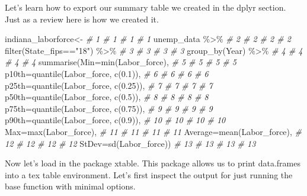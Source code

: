 \documentclass[
]{book}
\newenvironment{Shaded}{\begin{snugshade}}{\end{snugshade}}
\newcommand{\AttributeTok}[1]{\textcolor[rgb]{0.77,0.63,0.00}{#1}}
\newcommand{\CommentTok}[1]{\textcolor[rgb]{0.56,0.35,0.01}{\textit{#1}}}
\newcommand{\FloatTok}[1]{\textcolor[rgb]{0.00,0.00,0.81}{#1}}
\newcommand{\FunctionTok}[1]{\textcolor[rgb]{0.00,0.00,0.00}{#1}}
\newcommand{\NormalTok}[1]{#1}
\newcommand{\OtherTok}[1]{\textcolor[rgb]{0.56,0.35,0.01}{#1}}
\newcommand{\SpecialCharTok}[1]{\textcolor[rgb]{0.00,0.00,0.00}{#1}}
\newcommand{\StringTok}[1]{\textcolor[rgb]{0.31,0.60,0.02}{#1}}
\begin{document}
Let's learn how to export our summary table we created in the dplyr section. Just as a review here is how we created it.

\begin{Shaded}
\begin{Highlighting}[]
\NormalTok{indiana\_laborforce}\OtherTok{\textless{}{-}}                       \CommentTok{\# 1   \# 1   \# 1   \# 1}
\NormalTok{  unemp\_data }\SpecialCharTok{\%\textgreater{}\%}                           \CommentTok{\# 2   \# 2   \# 2   \# 2}
  \FunctionTok{filter}\NormalTok{(State\_fips}\SpecialCharTok{==}\StringTok{"18"}\NormalTok{) }\SpecialCharTok{\%\textgreater{}\%}             \CommentTok{\# 3   \# 3   \# 3   \# 3}
  \FunctionTok{group\_by}\NormalTok{(Year) }\SpecialCharTok{\%\textgreater{}\%}                       \CommentTok{\# 4   \# 4   \# 4   \# 4}
  \FunctionTok{summarise}\NormalTok{(}\AttributeTok{Min=}\FunctionTok{min}\NormalTok{(Labor\_force),          }\CommentTok{\# 5   \# 5   \# 5   \# 5}
    \AttributeTok{p10th=}\FunctionTok{quantile}\NormalTok{(Labor\_force, }\FunctionTok{c}\NormalTok{(}\FloatTok{0.1}\NormalTok{)),   }\CommentTok{\# 6   \# 6   \# 6   \# 6}
    \AttributeTok{p25th=}\FunctionTok{quantile}\NormalTok{(Labor\_force, }\FunctionTok{c}\NormalTok{(}\FloatTok{0.25}\NormalTok{)),  }\CommentTok{\# 7   \# 7   \# 7   \# 7}
    \AttributeTok{p50th=}\FunctionTok{quantile}\NormalTok{(Labor\_force, }\FunctionTok{c}\NormalTok{(}\FloatTok{0.5}\NormalTok{)),   }\CommentTok{\# 8   \# 8   \# 8   \# 8}
    \AttributeTok{p75th=}\FunctionTok{quantile}\NormalTok{(Labor\_force, }\FunctionTok{c}\NormalTok{(}\FloatTok{0.75}\NormalTok{)),  }\CommentTok{\# 9   \# 9   \# 9   \# 9}
    \AttributeTok{p90th=}\FunctionTok{quantile}\NormalTok{(Labor\_force, }\FunctionTok{c}\NormalTok{(}\FloatTok{0.9}\NormalTok{)),  }\CommentTok{\# 10  \# 10  \# 10  \# 10}
    \AttributeTok{Max=}\FunctionTok{max}\NormalTok{(Labor\_force),                 }\CommentTok{\# 11  \# 11  \# 11  \# 11}
    \AttributeTok{Average=}\FunctionTok{mean}\NormalTok{(Labor\_force),            }\CommentTok{\# 12  \# 12  \# 12  \# 12}
    \AttributeTok{StDev=}\FunctionTok{sd}\NormalTok{(Labor\_force))                }\CommentTok{\# 13  \# 13  \# 13  \# 13}
\end{Highlighting}
\end{Shaded}

Now let's load in the package xtable. This package allows us to print data.frames into a tex table environment. Let's first inspect the output for just running the base function with minimal options.
\end{document}
